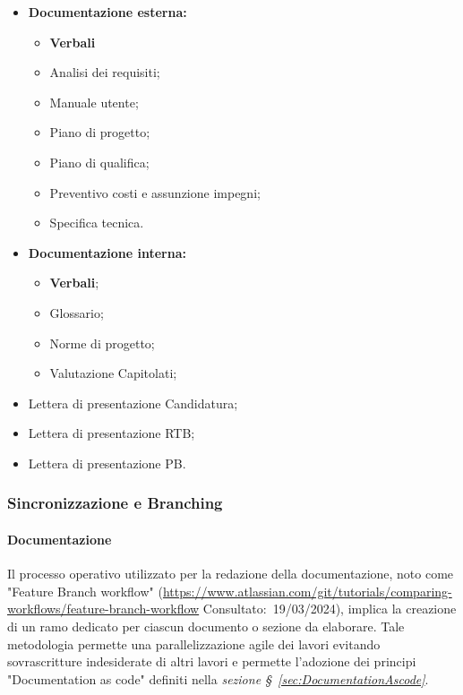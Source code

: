 \begin{itemize}
    \item \textbf{Documentazione esterna:}
        \begin{itemize}
            \item \textbf{Verbali}
            \item Analisi dei requisiti;
            \item Manuale utente;
            \item Piano di progetto;
            \item Piano di qualifica;
            \item Preventivo costi e assunzione impegni;
            \item Specifica tecnica.
        \end{itemize}
    \item \textbf{Documentazione interna:}
        \begin{itemize}
            \item \textbf{Verbali};
            \item Glossario;
            \item Norme di progetto;
            \item Valutazione Capitolati;
        \end{itemize}
    \item Lettera di presentazione Candidatura;
    \item Lettera di presentazione RTB;
    \item Lettera di presentazione PB.
\end{itemize}

\hypertarget{subsubsec:sincronizzazione&branching}{\subsubsection{Sincronizzazione e Branching}}
\paragraph{Documentazione}
Il processo operativo utilizzato per la redazione della documentazione, noto come "Feature Branch workflow" (\url{https://www.atlassian.com/git/tutorials/comparing-workflows/feature-branch-workflow} Consultato:~19/03/2024), implica la creazione di un ramo dedicato per ciascun documento o sezione da elaborare.
Tale metodologia permette una parallelizzazione agile dei lavori evitando sovrascritture indesiderate di altri lavori e permette l'adozione dei principi "Documentation as code" definiti nella \textit{sezione \S~\ref{sec:DocumentationAscode}}. \\ 

